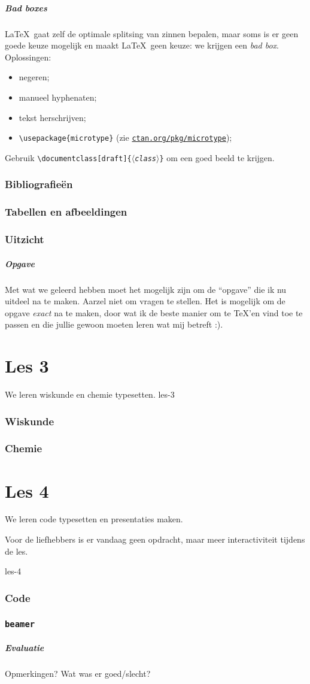 \documentclass{beamer}
\newcommand\package[1]{\href{http://ctan.org/pkg/#1}{\texttt{ctan.org/pkg/#1}}}
\newcommand\exercise{
\begin{frame}
  \frametitle{Opgave}

  Met wat we geleerd hebben moet het mogelijk zijn om de ``opgave'' die ik nu uitdeel na te maken. Aarzel niet om vragen te stellen. Het is mogelijk om de opgave \emph{exact} na te maken, door wat ik de beste manier om te \TeX'en vind toe te passen en die jullie gewoon moeten leren wat mij betreft :).
\end{frame}
}
\begin{document}
\begin{frame}
  \frametitle{Bad boxes}

  \LaTeX\ gaat zelf de optimale splitsing van zinnen bepalen, maar soms is er geen goede keuze mogelijk en maakt \LaTeX\ geen keuze: we krijgen een \emph{bad box}. Oplossingen:
  \begin{itemize}
    \item negeren;
    \item manueel hyphenaten;
    \item tekst herschrijven;
    \item \texttt{\textcolor{uagreen}{\textbackslash usepackage}\{microtype\}} (zie \package{microtype});
  \end{itemize}

  Gebruik \texttt{\textcolor{uagreen}{\textbackslash documentclass}[draft]\{$\langle$\textsl{class}$\rangle$\}} om een goed beeld te krijgen.
\end{frame}

\section{Bibliografie\"en}

\section{Tabellen en afbeeldingen}

\section{Uitzicht}


\exercise

\part{Les 3}
\lecture
{We leren wiskunde en chemie typesetten.}
{les-3}
\section{Wiskunde}

\section{Chemie}



\part{Les 4}
\lecture
{We leren code typesetten en presentaties maken.

Voor de liefhebbers is er vandaag geen opdracht, maar meer interactiviteit tijdens de les.}
{les-4}
\section{Code}

\section{\texttt{beamer}}


\begin{frame}
  \frametitle{Evaluatie}

  Opmerkingen? Wat was er goed/slecht?
\end{frame}
\end{document}
